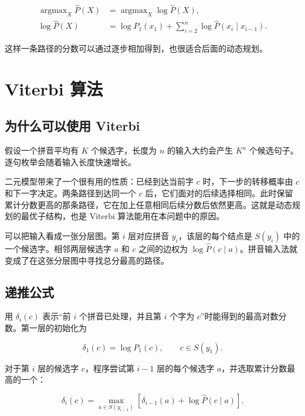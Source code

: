 \documentclass[11pt,a4paper]{ctexart}
\begin{document}
\begin{equation}
\begin{aligned}
\mathop{\arg\max}_X \widehat P(X)
&=\mathop{\arg\max}_X \log \widehat P(X),\\
\log \widehat P(X)
&=\log P_1(x_1)+
\sum_{i=2}^{n}\log \widehat P(x_i\mid x_{i-1}).
\end{aligned}
\end{equation}

这样一条路径的分数可以通过逐步相加得到，也很适合后面的动态规划。

\section{Viterbi 算法}

\subsection{为什么可以使用 Viterbi}

假设一个拼音平均有 $K$ 个候选字，长度为 $n$ 的输入大约会产生 $K^n$ 个候选句子。逐句枚举会随着输入长度快速增长。

二元模型带来了一个很有用的性质：已经到达当前字 $c$ 时，下一步的转移概率由 $c$ 和下一字决定。两条路径到达同一个 $c$ 后，它们面对的后续选择相同。此时保留累计分数更高的那条路径，它在加上任意相同后续分数后依然更高。这就是动态规划的最优子结构，也是 Viterbi 算法能用在本问题中的原因。

可以把输入看成一张分层图。第 $i$ 层对应拼音 $y_i$，该层的每个结点是 $S(y_i)$ 中的一个候选字。相邻两层候选字 $a$ 和 $c$ 之间的边权为 $\log\widehat P(c\mid a)$。拼音输入法就变成了在这张分层图中寻找总分最高的路径。

\subsection{递推公式}

用 $\delta_i(c)$ 表示“前 $i$ 个拼音已处理，并且第 $i$ 个字为 $c$”时能得到的最高对数分数。第一层的初始化为

\begin{equation}
\delta_1(c)=\log P_1(c),\qquad c\in S(y_1).
\end{equation}

对于第 $i$ 层的候选字 $c$，程序尝试第 $i-1$ 层的每个候选字 $a$，并选取累计分数最高的一个：

\begin{equation}
\delta_i(c)=
\max_{a\in S(y_{i-1})}
\left[\delta_{i-1}(a)+\log\widehat P(c\mid a)\right].
\end{equation}
\end{document}
